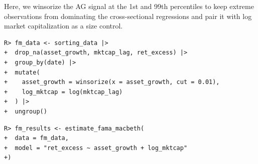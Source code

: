 \documentclass[
  article]{jss}
\begin{document}
Here, we winsorize the AG signal at the 1st and 99th percentiles to keep
extreme observations from dominating the cross-sectional regressions and
pair it with log market capitalization as a size control.

\begin{verbatim}
R> fm_data <- sorting_data |>
+  drop_na(asset_growth, mktcap_lag, ret_excess) |>
+  group_by(date) |>
+  mutate(
+    asset_growth = winsorize(x = asset_growth, cut = 0.01),
+    log_mktcap = log(mktcap_lag)
+  ) |>
+  ungroup()
\end{verbatim}

\begin{verbatim}
R> fm_results <- estimate_fama_macbeth(
+  data = fm_data,
+  model = "ret_excess ~ asset_growth + log_mktcap"
+)
\end{verbatim}

\begin{table}


\caption{\label{tbl-fama-macbeth}Fama-MacBeth regression of monthly
excess returns on lagged asset growth and lagged log market
capitalization. Coefficients are time-series averages of monthly
cross-sectional OLS estimates; standard errors are Newey-West
\citep{newey.1987} with automatic lag selection. The intercept and
slopes on the right-hand-side variables are reported on the monthly
scale. Sample: 1974--2024.}

\end{table}%
\end{document}
